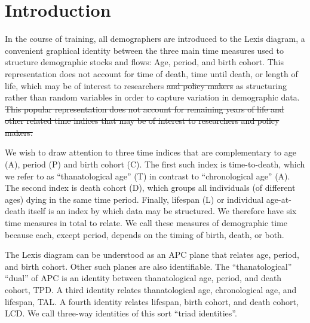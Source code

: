 \documentclass[12pt,oneside,a4paper]{article} %
\theoremstyle{definition}
\begin{document}
\section{Introduction}
In the course of training, all demographers are introduced
to the Lexis diagram, a convenient graphical identity between the three main
time measures used to structure demographic stocks and flows: Age, period, and
birth cohort. This representation does not account for time of death, time until
death, or length of life, which may be of interest to researchers \st{and
policy makers} as structuring rather than random variables in order to capture
variation in demographic data.
\st{This popular representation does not account for remaining years of life and other related time indices that may be of interest to researchers and
policy makers.} %

We wish to draw attention to three time indices that are complementary to age
(A), period (P) and birth cohort (C). The first such index is time-to-death,
which we refer to as ``thanatological age'' (T) in contrast to ``chronological
age'' (A). The second index is death cohort (D), which groups all individuals
(of different ages) dying in the same time period. Finally, lifespan (L) or
individual age-at-death itself is an index by which data may be structured.
We therefore have six time measures in total to relate. We call these measures of demographic
time because each, except period, depends on the timing of birth, death, or
both.

The Lexis diagram can be understood as an APC plane
that relates age, period, and birth cohort. Other such planes are
also identifiable.
The ``thanatological'' ``dual'' of APC is an identity between thanatological
age, period, and death cohort, TPD. A third identity relates thanatological age,
chronological age, and lifespan, TAL. A fourth identity relates lifespan, birth
cohort, and death cohort, LCD. We call three-way identities of this sort ``triad identities''.
\end{document}
